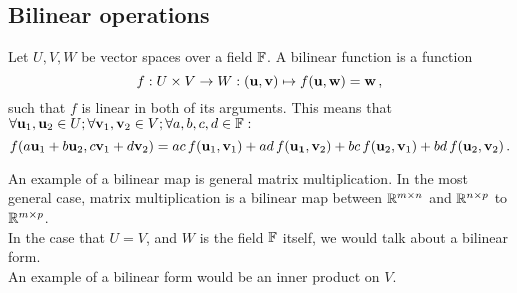 \subsection{Bilinear operations}
    Let $U, V, W$ be vector spaces over a field $\mathbb{F}$. A bilinear function is a function
    \begin{equation}
        f: U \times V \rightarrow W: (\vb{u}, \vb{v}) \mapsto f(\vb{u}, \vb{w}) = \vb{w} \thinspace ,
    \end{equation}
    such that $f$ is linear in both of its arguments. This means that $\forall \vb{u}_1, \vb{u}_2 \in U; \forall \vb{v}_1, \vb{v}_2 \in V; \forall a, b, c, d \in \mathbb{F}:$
    \begin{equation}
        f(a \vb{u}_1 + b \vb{u}_2, c \vb{v}_1 + d \vb{v}_2) = ac \thinspace f(\vb{u}_1, \vb{v}_1) + ad \thinspace f(\vb{u_1}, \vb{v}_2) + bc \thinspace f(\vb{u}_2, \vb{v}_1) + bd \thinspace f(\vb{u}_2, \vb{v}_2) \thinspace .
    \end{equation}

    An example of a bilinear map is general matrix multiplication. In the most general case, matrix multiplication is a bilinear map between $\mathbb{R}^{m \times n}$ and $\mathbb{R}^{n \times p}$ to $\mathbb{R}^{m \times p}$. \\

    In the case that $U=V$, and $W$ is the field $\mathbb{F}$ itself, we would talk about a bilinear form. \\

    An example of a bilinear form would be an inner product on $V$. \\
